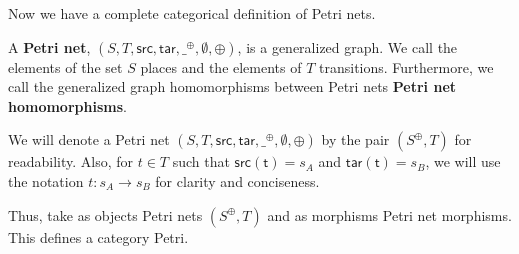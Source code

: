 Now we have a complete categorical definition of Petri nets.
%
\begin{definition}
  \label{def:Petri-Net}
  A \textbf{Petri net}, $(S, T, \mathsf{src},
  \mathsf{tar},\_^{\oplus},\emptyset,\oplus)$, is a generalized graph.  We call
  the elements of the set $S$ places and the elements of $T$
  transitions.  Furthermore, we call the generalized graph
  homomorphisms between Petri nets \textbf{Petri net homomorphisms}.
\end{definition}
We will denote a Petri net $(S, T, \mathsf{src},
\mathsf{tar},\_^{\oplus},\emptyset,\oplus)$ by the pair $(S^\oplus,T)$ for
readability. Also, for $t \in T$ such that $\mathsf{src(t)} = s_A$ and $\mathsf{tar(t)} = s_B$, we will use the notation $t : s_A \rightarrow s_B$ for clarity and conciseness. 

Thus, take as objects Petri nets $(S^\oplus, T)$ and as morphisms Petri net morphisms. This defines a category Petri.
